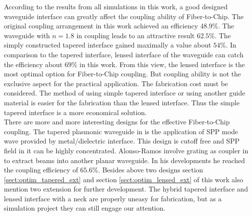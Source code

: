 According to the results from all simulations in this work, a good designed waveguide interface can greatly affect the coupling ability of Fiber-to-Chip. The original coupling arrangement in this work achieved an efficiency $48.9\%$. The waveguide with $n=1.8$ in coupling leads to an attractive result $62.5\%$. The simply constructed tapered interface gained maximally a value about $54\%$. In comparison to the tapered interface, lensed interface of the waveguide can catch the efficiency about $69\%$ in this work. From this view, the lensed interface is the most optimal option for Fiber-to-Chip coupling. But coupling ability is not the exclusive aspect for the practical application. The fabrication cost must be considered. The method of using simple tapered interface or using another guide material is easier for the fabrication than the lensed interface. Thus the simple tapered interface is a more economical solution. \\
       
There are more and more interesting designs for the effective Fiber-to-Chip coupling. The tapered plasmonic waveguide in \cite{tapered_plasmonic_waveguides} is the application of SPP mode wave provided by metal/dielectric interface. This design is cutoff free and SPP field in it can be highly concentrated. Alonso-Ramos involve grating as coupler in \cite{fiber_to_chip_grating_waveguides} to extract beams into another planar waveguide. In his developments he reached the coupling efficiency of $65.6\%$. Besides above two designs section \ref{sect:optim_tapered_ext} and section \ref{sect:optim_lensed_ext} of this work also mention two extension for further development. The hybrid tapered interface and lensed interface with a neck are properly uneasy for fabrication, but as a simulation project they can still engage our attention.